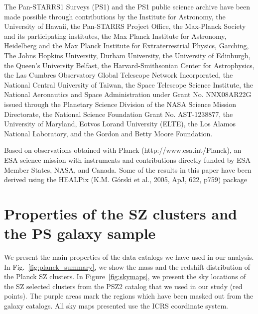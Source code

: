 \documentclass[iop, apjl, twocolappendix, numberedappendix]{emulateapj}
\begin{document}
The Pan-STARRS1 Surveys (PS1) and the PS1 public science archive
have been made possible through contributions by the Institute for
Astronomy, the University of Hawaii, the Pan-STARRS Project Office,
the Max-Planck Society and its participating institutes, the Max
Planck Institute for Astronomy, Heidelberg and the Max Planck
Institute for Extraterrestrial Physics, Garching, The Johns Hopkins
University, Durham University, the University of Edinburgh, the
Queen's University Belfast, the Harvard-Smithsonian Center for
Astrophysics, the Las Cumbres Observatory Global Telescope Network
Incorporated, the National Central University of Taiwan, the Space
Telescope Science Institute, the National Aeronautics and Space
Administration under Grant No. NNX08AR22G issued through the
Planetary Science Division of the NASA Science Mission Directorate,
the National Science Foundation Grant No. AST-1238877, the
University of Maryland, Eotvos Lorand University (ELTE), the Los
Alamos National Laboratory, and the Gordon and Betty Moore
Foundation.

Based on observations obtained with Planck
(http://www.esa.int/Planck), an ESA science mission with instruments
and contributions directly funded by ESA Member States, NASA, and
Canada.  Some of the results in this paper have been derived using
the HEALPix (K.M. Górski et al., 2005, ApJ, 622, p759) package




\appendix


\section{Properties of the SZ clusters and the PS galaxy sample}
\label{sec:figures}

We present the main properties of the data catalogs we have used in our
analysis. In Fig.~\ref{fig:planck_summary}, we show the mass and the redshift
distribution of the Planck SZ clusters. In Figure~\ref{fig:skymaps}, we present
the sky locations of the SZ selected clusters from the PSZ2 catalog that we
used in our study (red points). The purple areas mark the regions which have
been masked out from the galaxy catalogs. All sky maps presented use the ICRS
coordinate system.
\end{document}
